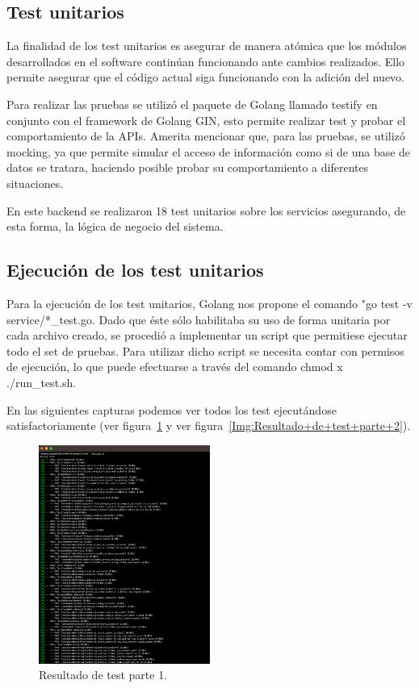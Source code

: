 \subsection{Test unitarios}
La finalidad de los test unitarios es asegurar de manera atómica que los módulos desarrollados en el software continúan funcionando ante cambios realizados. Ello permite asegurar que el código actual siga funcionando con la adición del nuevo.

Para realizar las pruebas se utilizó el paquete de Golang llamado testify en conjunto con el framework de Golang GIN, esto permite realizar test y probar el comportamiento de la APIs.
Amerita mencionar que, para las pruebas, se utilizó mocking, ya que permite simular el acceso de información como si de una base de datos se tratara, haciendo posible probar su comportamiento a diferentes situaciones.

En este backend se realizaron 18 test unitarios sobre los servicios asegurando, de esta forma, la lógica de negocio del sistema.

\subsection{Ejecución de los test unitarios}
Para la ejecución de los test unitarios, Golang nos propone el comando "go test -v service/*\_test.go. Dado que éste sólo habilitaba su uso de forma unitaria por cada archivo creado, se procedió a implementar un script que permitiese ejecutar todo el set de pruebas.
Para utilizar dicho script se necesita contar con permisos de ejecución, lo que puede efectuarse a través del comando chmod x ./run\_test.sh.

En las siguientes capturas podemos ver todos los test ejecutándose satisfactoriamente
(ver figura~\ref{Img:Resultado+de+test+parte+1} y ver figura~\ref{Img:Resultado+de+test+parte+2}).

\begin{figure}[h]
    \centering
    \includegraphics[width=0.5\textwidth]{img/manual/test_parte_1.png}
    \caption{Resultado de test parte 1.} \label{Img:Resultado+de+test+parte+1}
\end{figure} 


